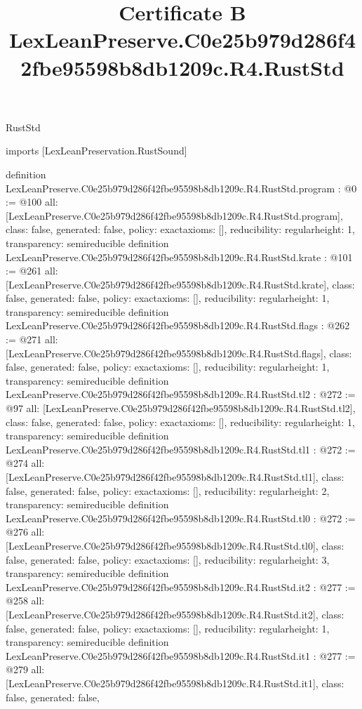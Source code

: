 \begin{lexlean}{RustStd}
\title{Certificate B LexLeanPreserve.C0e25b979d286f42fbe95598b8db1209c.R4.RustStd}
\begin{coremodule}
imports [LexLeanPreservation.RustSound]

definition LexLeanPreserve.C0e25b979d286f42fbe95598b8db1209c.R4.RustStd.program : @0 := @100 {
  all: [LexLeanPreserve.C0e25b979d286f42fbe95598b8db1209c.R4.RustStd.program],
  class: false,
  generated: false,
  policy: exact{axioms: []},
  reducibility: regular{height: 1},
  transparency: semireducible
}
definition LexLeanPreserve.C0e25b979d286f42fbe95598b8db1209c.R4.RustStd.krate : @101 := @261 {
  all: [LexLeanPreserve.C0e25b979d286f42fbe95598b8db1209c.R4.RustStd.krate],
  class: false,
  generated: false,
  policy: exact{axioms: []},
  reducibility: regular{height: 1},
  transparency: semireducible
}
definition LexLeanPreserve.C0e25b979d286f42fbe95598b8db1209c.R4.RustStd.flags : @262 := @271 {
  all: [LexLeanPreserve.C0e25b979d286f42fbe95598b8db1209c.R4.RustStd.flags],
  class: false,
  generated: false,
  policy: exact{axioms: []},
  reducibility: regular{height: 1},
  transparency: semireducible
}
definition LexLeanPreserve.C0e25b979d286f42fbe95598b8db1209c.R4.RustStd.tl2 : @272 := @97 {
  all: [LexLeanPreserve.C0e25b979d286f42fbe95598b8db1209c.R4.RustStd.tl2],
  class: false,
  generated: false,
  policy: exact{axioms: []},
  reducibility: regular{height: 1},
  transparency: semireducible
}
definition LexLeanPreserve.C0e25b979d286f42fbe95598b8db1209c.R4.RustStd.tl1 : @272 := @274 {
  all: [LexLeanPreserve.C0e25b979d286f42fbe95598b8db1209c.R4.RustStd.tl1],
  class: false,
  generated: false,
  policy: exact{axioms: []},
  reducibility: regular{height: 2},
  transparency: semireducible
}
definition LexLeanPreserve.C0e25b979d286f42fbe95598b8db1209c.R4.RustStd.tl0 : @272 := @276 {
  all: [LexLeanPreserve.C0e25b979d286f42fbe95598b8db1209c.R4.RustStd.tl0],
  class: false,
  generated: false,
  policy: exact{axioms: []},
  reducibility: regular{height: 3},
  transparency: semireducible
}
definition LexLeanPreserve.C0e25b979d286f42fbe95598b8db1209c.R4.RustStd.it2 : @277 := @258 {
  all: [LexLeanPreserve.C0e25b979d286f42fbe95598b8db1209c.R4.RustStd.it2],
  class: false,
  generated: false,
  policy: exact{axioms: []},
  reducibility: regular{height: 1},
  transparency: semireducible
}
definition LexLeanPreserve.C0e25b979d286f42fbe95598b8db1209c.R4.RustStd.it1 : @277 := @279 {
  all: [LexLeanPreserve.C0e25b979d286f42fbe95598b8db1209c.R4.RustStd.it1],
  class: false,
  generated: false,
}
\end{coremodule}
\end{lexlean}
